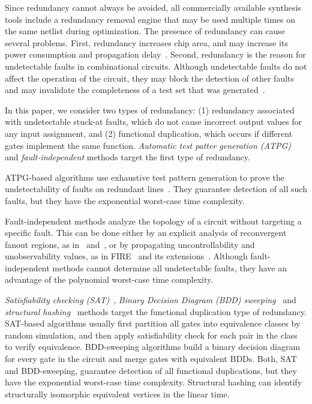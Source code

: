\documentclass[conference]{IEEEtran} \usepackage{times}
\begin{document}
Since redundancy cannot always be avoided, 
all commercially available synthesis tools include a redundancy
removal engine that may be used multiple times on the same netlist
during optimization.  The presence of redundancy can cause several
problems. First, redundancy increases chip area, and may increase its
power consumption and propagation delay~\cite{LiLC95}. Second,
redundancy is the reason for undetectable faults in combinational
circuits.  Although undetectable faults do not affect the operation of
the circuit, they may block the detection of other faults and may
invalidate the completeness of a test set that was
generated~\cite{AbI92}.

In this paper, we consider two types of redundancy: (1)
redundancy associated with undetectable stuck-at faults, which do not
cause incorrect output values for any input assignment, and (2)
functional duplication, which occurs if different gates implement the
same function. {\em Automatic test patter generation (ATPG)} and {\em
fault-independent} methods target the first type of
redundancy. 

ATPG-based algorithms use exhaustive test pattern
generation to prove the undetectability of faults on redundant
lines~\cite{Fr67,ScA89,BeE02,BrD94}. They guarantee detection of all
such faults, but they have the exponential worst-case time complexity.

Fault-independent methods analyze the topology of a circuit without
targeting a specific fault. This can be done either by an explicit
analysis of reconvergent fanout regions, as in~\cite{HaM89}
and~\cite{MeA92}, or by propagating uncontrollability and
unobservability values, as in FIRE~\cite{IyA96} and its
extensions~\cite{GuH00,Hs02,ViSH05}. Although fault-independent
methods cannot determine all undetectable faults, they have an
advantage of the polynomial worst-case time complexity.

{\em Satisfiability checking (SAT)}~\cite{KiSSS97}, {\em Binary
Decision Diagram (BDD) sweeping}~\cite{kuehlmann} and {\em structural
hashing}~\cite{KuKr97} methods target the functional duplication type
of redundancy. SAT-based algorithms usually first partition all gates into
equivalence classes by random simulation, and then apply
satisfiability check for each pair in the class to verify equivalence.
BDD-sweeping algorithms build a binary decision diagram for
every gate in the circuit and merge gates with equivalent BDDs.  Both,
SAT and BDD-sweeping, guarantee detection of all functional
duplications, but they have the exponential worst-case time complexity.
Structural hashing can identify structurally isomorphic equivalent
vertices in the linear time.
\end{document}
